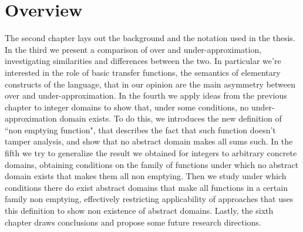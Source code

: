 \section{Overview}
The second chapter lays out the background and the notation used in the thesis.
In the third we present a comparison of over and under-approximation, investigating similarities and differences between the two. In particular we're interested in the role of basic transfer functions, the semantics of elementary constructs of the language, that in our opinion are the main asymmetry between over and under-approximation.
In the fourth we apply ideas from the previous chapter to integer domains to show that, under some conditions, no under-approximation domain exists. To do this, we introduces the new definition of ``non emptying function", that describes the fact that such function doesn't tamper analysis, and show that no abstract domain makes all sums such.
In the fifth we try to generalize the result we obtained for integers to arbitrary concrete domains, obtaining conditions on the family of functions under which no abstract domain exists that makes them all non emptying. Then we study under which conditions there do exist abstract domains that make all functions in a certain family non emptying, effectively restricting applicability of approaches that uses this definition to show non existence of abstract domains.
Lastly, the sixth chapter draws conclusions and propose some future research directions.
